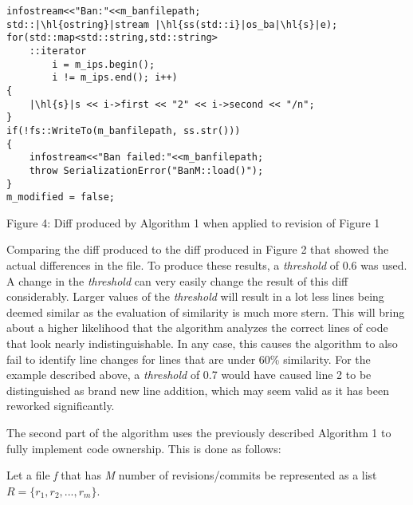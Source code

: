 \begin{verbatim}
infostream<<"Ban:"<<m_banfilepath;
std::|\hl{ostring}|stream |\hl{ss(std::i}|os_ba|\hl{s}|e);
for(std::map<std::string,std::string>
    ::iterator
        i = m_ips.begin();
        i != m_ips.end(); i++)
{
    |\hl{s}|s << i->first << "2" << i->second << "/n";
}
if(!fs::WriteTo(m_banfilepath, ss.str()))
{
    infostream<<"Ban failed:"<<m_banfilepath;
    throw SerializationError("BanM::load()");
}
m_modified = false;
\end{verbatim}
\begin{center}
    \caption{Figure 4: Diff produced by Algorithm 1 when applied to revision of Figure 1 \citep{ahola_2018}}
\end{center}

Comparing the diff produced to the diff produced in Figure 2 that showed the actual differences in the file. To produce these results, a \textit{threshold} of 0.6 was used. A change in the \textit{threshold} can very easily change the result of this diff considerably. Larger values of the \textit{threshold} will result in a lot less lines being deemed similar as the evaluation of similarity is much more stern. This will bring about a higher likelihood that the algorithm analyzes the correct lines of code that look nearly indistinguishable. In any case, this causes the algorithm to also fail to identify line changes for lines that are under 60\% similarity. For the example described above, a \textit{threshold} of 0.7 would have caused line 2 to be distinguished as brand new line addition, which may seem valid as it has been reworked significantly.

The second part of the algorithm uses the previously described Algorithm 1 to fully implement code ownership. This is done as follows:

Let a file \textit{f} that has \textit{M} number of revisions/commits be represented as a list $R = \{ r_1, r_2, ..., r_m \}$. 